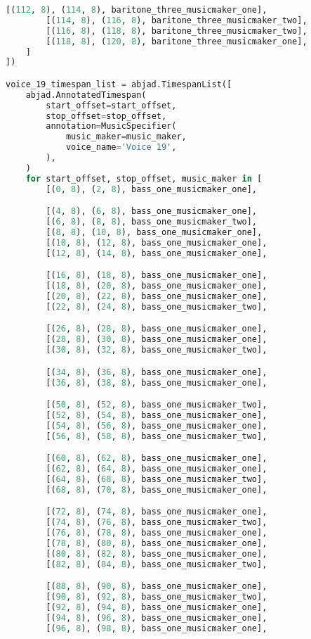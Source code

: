 \begin{lstlisting}[language=Python, caption=Invocation Source Code]
        [(112, 8), (114, 8), baritone_three_musicmaker_one],
        [(114, 8), (116, 8), baritone_three_musicmaker_two],
        [(116, 8), (118, 8), baritone_three_musicmaker_two],
        [(118, 8), (120, 8), baritone_three_musicmaker_one],
    ]
])

voice_19_timespan_list = abjad.TimespanList([
    abjad.AnnotatedTimespan(
        start_offset=start_offset,
        stop_offset=stop_offset,
        annotation=MusicSpecifier(
            music_maker=music_maker,
            voice_name='Voice 19',
        ),
    )
    for start_offset, stop_offset, music_maker in [
        [(0, 8), (2, 8), bass_one_musicmaker_one],

        [(4, 8), (6, 8), bass_one_musicmaker_one],
        [(6, 8), (8, 8), bass_one_musicmaker_two],
        [(8, 8), (10, 8), bass_one_musicmaker_one],
        [(10, 8), (12, 8), bass_one_musicmaker_one],
        [(12, 8), (14, 8), bass_one_musicmaker_one],

        [(16, 8), (18, 8), bass_one_musicmaker_one],
        [(18, 8), (20, 8), bass_one_musicmaker_one],
        [(20, 8), (22, 8), bass_one_musicmaker_one],
        [(22, 8), (24, 8), bass_one_musicmaker_two],

        [(26, 8), (28, 8), bass_one_musicmaker_one],
        [(28, 8), (30, 8), bass_one_musicmaker_one],
        [(30, 8), (32, 8), bass_one_musicmaker_two],

        [(34, 8), (36, 8), bass_one_musicmaker_one],
        [(36, 8), (38, 8), bass_one_musicmaker_one],

        [(50, 8), (52, 8), bass_one_musicmaker_two],
        [(52, 8), (54, 8), bass_one_musicmaker_one],
        [(54, 8), (56, 8), bass_one_musicmaker_one],
        [(56, 8), (58, 8), bass_one_musicmaker_two],

        [(60, 8), (62, 8), bass_one_musicmaker_one],
        [(62, 8), (64, 8), bass_one_musicmaker_one],
        [(64, 8), (68, 8), bass_one_musicmaker_two],
        [(68, 8), (70, 8), bass_one_musicmaker_one],

        [(72, 8), (74, 8), bass_one_musicmaker_one],
        [(74, 8), (76, 8), bass_one_musicmaker_two],
        [(76, 8), (78, 8), bass_one_musicmaker_one],
        [(78, 8), (80, 8), bass_one_musicmaker_one],
        [(80, 8), (82, 8), bass_one_musicmaker_one],
        [(82, 8), (84, 8), bass_one_musicmaker_two],

        [(88, 8), (90, 8), bass_one_musicmaker_one],
        [(90, 8), (92, 8), bass_one_musicmaker_two],
        [(92, 8), (94, 8), bass_one_musicmaker_one],
        [(94, 8), (96, 8), bass_one_musicmaker_one],
        [(96, 8), (98, 8), bass_one_musicmaker_one],


\end{lstlisting}
